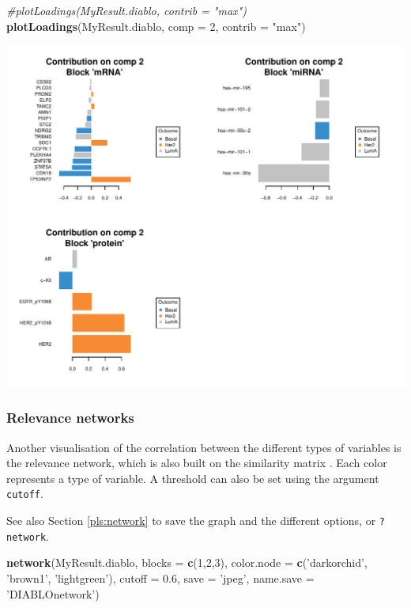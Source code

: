\documentclass[]{book}
\newenvironment{Shaded}{\begin{snugshade}}{\end{snugshade}}
\newcommand{\CommentTok}[1]{\textcolor[rgb]{0.56,0.35,0.01}{\textit{#1}}}
\newcommand{\DataTypeTok}[1]{\textcolor[rgb]{0.13,0.29,0.53}{#1}}
\newcommand{\DecValTok}[1]{\textcolor[rgb]{0.00,0.00,0.81}{#1}}
\newcommand{\FloatTok}[1]{\textcolor[rgb]{0.00,0.00,0.81}{#1}}
\newcommand{\KeywordTok}[1]{\textcolor[rgb]{0.13,0.29,0.53}{\textbf{#1}}}
\newcommand{\NormalTok}[1]{#1}
\newcommand{\StringTok}[1]{\textcolor[rgb]{0.31,0.60,0.02}{#1}}
\begin{document}
\begin{Shaded}
\begin{Highlighting}[]
\CommentTok{#plotLoadings(MyResult.diablo, contrib = "max")}
\KeywordTok{plotLoadings}\NormalTok{(MyResult.diablo, }\DataTypeTok{comp =} \DecValTok{2}\NormalTok{, }\DataTypeTok{contrib =} \StringTok{"max"}\NormalTok{)}
\end{Highlighting}
\end{Shaded}

\begin{center}\includegraphics[width=0.5\linewidth,]{Figures/06-plotLoadings-max-1} \end{center}

\hypertarget{relevance-networks}{%
\subsubsection{Relevance networks}\label{relevance-networks}}

Another visualisation of the correlation between the different types of variables is the relevance network, which is also built on the similarity matrix \citep{Gon12}. Each color represents a type of variable. A threshold can also be set using the argument \texttt{cutoff}.

See also Section \ref{pls:network} to save the graph and the different options, or \texttt{?network}.

\begin{Shaded}
\begin{Highlighting}[]
\KeywordTok{network}\NormalTok{(MyResult.diablo, }\DataTypeTok{blocks =} \KeywordTok{c}\NormalTok{(}\DecValTok{1}\NormalTok{,}\DecValTok{2}\NormalTok{,}\DecValTok{3}\NormalTok{),}
        \DataTypeTok{color.node =} \KeywordTok{c}\NormalTok{(}\StringTok{'darkorchid'}\NormalTok{, }\StringTok{'brown1'}\NormalTok{, }\StringTok{'lightgreen'}\NormalTok{), }
        \DataTypeTok{cutoff =} \FloatTok{0.6}\NormalTok{, }\DataTypeTok{save =} \StringTok{'jpeg'}\NormalTok{, }\DataTypeTok{name.save =} \StringTok{'DIABLOnetwork'}\NormalTok{)}
\end{Highlighting}
\end{Shaded}
\end{document}
